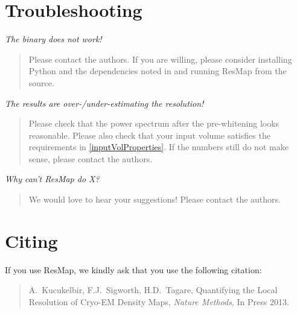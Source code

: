 \documentclass[10pt]{article}
\begin{document}

\clearpage
\section{Troubleshooting}

\textcolor{RedOrange}{\emph{The binary does not work!}}
\begin{quote}
	Please contact the authors. If you are willing, please consider installing Python and the dependencies noted in  and running ResMap from the source. 
\end{quote}

\textcolor{RedOrange}{\emph{The results are over-/under-estimating the resolution!}}
\begin{quote}
	Please check that the power spectrum after the pre-whitening looks reasonable. Please also check that your input volume satisfies the requirements in \cref{inputVolProperties}. If the numbers still do not make sense, please contact the authors.
\end{quote}

\textcolor{RedOrange}{\emph{Why can't ResMap do X?}}
\begin{quote}
	We would love to hear your suggestions! Please contact the authors.
\end{quote}

\section{Citing}
If you use ResMap, we kindly ask that you use the following citation:

\begin{quote}
	A.~Kucukelbir, F.J.~Sigworth, H.D.~Tagare, \textcolor{BrickRed}{Quantifying the Local Resolution of Cryo-EM Density Maps}, \textcolor{OliveGreen}{\emph{Nature Methods}}, In Press 2013.
\end{quote}
\end{document}
